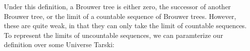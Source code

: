 \label{sec:discussion}

\begin{code}[hide]%
%
\>[2]\AgdaSpace{}%
\AgdaSpace{}%
\AgdaSpace{}%
\AgdaSpace{}%
\AgdaSymbol{(}\AgdaSpace{}%
\AgdaSymbol{;}\AgdaSpace{}%
\AgdaOperator{\AgdaFunction{\AgdaUnderscore{}<\AgdaUnderscore{}}}\AgdaSpace{}%
\AgdaSymbol{;}\AgdaSpace{}%
\AgdaOperator{\AgdaPrimitive{\AgdaUnderscore{}+\AgdaUnderscore{}}}\AgdaSymbol{)}\<%
\\
%
\>[2]\AgdaSpace{}%
\AgdaSpace{}%
\<%
\\
%
\>[2]\AgdaSpace{}%
\AgdaSpace{}%
\<%
\\
%
\>[2]\AgdaSpace{}%
\AgdaSpace{}%
\<%
\\
%
\>[2]\AgdaSpace{}%
\AgdaSpace{}%
\<%
\\
\>[0]\<%
\end{code}

Under this definition, a Brouwer tree is either zero, the successor of another Brouwer tree, or the limit of a countable sequence of Brouwer trees. However, these are quite weak, in that they can only take the limit of countable sequences.
To represent the limits of uncountable sequences, we can paramterize our definition over some Universe \ala Tarski:

\begin{code}%
\>[0][@{}l@{\AgdaIndent{1}}]%
\>[2]\AgdaSpace{}%
\AgdaSpace{}%
\AgdaSymbol{\{}\AgdaSymbol{\}}\<%
\\
\>[2][@{}l@{\AgdaIndent{0}}]%
\>[4]\AgdaSymbol{(}\AgdaSpace{}%
\AgdaSymbol{:}\AgdaSpace{}%
\AgdaSpace{}%
\AgdaSymbol{)}\<%
\\
%
\>[4]\AgdaSymbol{(}\AgdaSpace{}%
\AgdaSymbol{:}\AgdaSpace{}%
\AgdaSpace{}%
\AgdaSpace{}%
\AgdaSpace{}%
\AgdaSymbol{)}\<%
\\
%
\>[4]\AgdaSymbol{(}\AgdaSpace{}%
\AgdaSymbol{:}\AgdaSpace{}%
\AgdaSymbol{)}\AgdaSpace{}%
\AgdaSymbol{(}\AgdaSpace{}%
\AgdaSymbol{:}\AgdaSpace{}%
\AgdaSpace{}%
\AgdaSymbol{(}\AgdaSpace{}%
\AgdaSymbol{)}\AgdaSpace{}%
\AgdaSpace{}%
\AgdaSymbol{)}\AgdaSpace{}%
\<%
\end{code}


